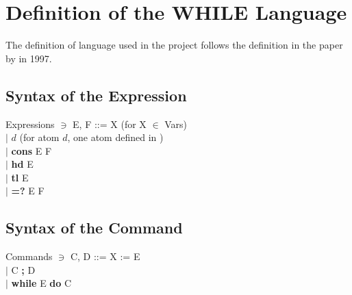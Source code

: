 \chapter{Definition of the WHILE Language}\label{definition: while definition}
The definition of \WHILE language used in the project follows the definition in the paper  by  in 1997\cite{jones_computability_1997}.
\section{Syntax of the Expression}\label{appendix:syntax of expression}
Expressions \hspace{0.3cm}$\ni$\hspace{0.3cm} E, F\hspace{0.1cm} ::= X \hspace{0.98cm}(for X $\in$ Vars)\\
\indent\hspace{4.2cm}$|$ $d$\hspace{1cm} (for atom $d$, one atom  defined in \Agda)\\
\indent\hspace{4.2cm}$|$ \textbf{cons} E F\\
\indent\hspace{4.2cm}$|$ \textbf{hd} E\\
\indent\hspace{4.2cm}$|$ \textbf{tl} E\\
\indent\hspace{4.2cm}$|$ \textbf{=?} E F\\
\section{Syntax of the Command}\label{appendix:syntax of command}
Commands \hspace{0.35cm}$\ni$\hspace{0.35cm} C, D\hspace{0.1cm} ::= X := E\\
\indent\hspace{4.2cm}$|$ C \textbf{;} D\\
\indent\hspace{4.2cm}$|$ \textbf{while} E \textbf{do} C\\
